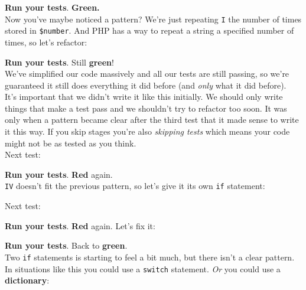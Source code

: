 \textbf{Run your tests}. \textbf{Green.}
\\

Now you've maybe noticed a pattern? We're just repeating \texttt{I} the number of times stored in \texttt{\$number}. And PHP has a way to repeat a string a specified number of times, so let's refactor:


\textbf{Run your tests}. Still \textbf{green}!
\\

We've simplified our code massively and all our tests are still passing, so we're guaranteed it still does everything it did before (and \textit{only} what it did before).
\\

It's important that we didn't write it like this initially. We should only write things that make a test pass and we shouldn't try to refactor too soon. It was only when a pattern became clear after the third test that it made sense to write it this way. If you skip stages you're also \textit{skipping tests} which means your code might not be as tested as you think.
\\


Next test:



\textbf{Run your tests}. \textbf{Red} again.
\\

\texttt{IV} doesn't fit the previous pattern, so let's give it its own \texttt{if} statement:




Next test:


\textbf{Run your tests}. \textbf{Red} again. Let's fix it:




\textbf{Run your tests}. Back to \textbf{green}.
\\

Two \texttt{if} statements is starting to feel a bit much, but there isn't a clear pattern. In situations like this you could use a \texttt{switch} statement. \textit{Or} you could use a \textbf{dictionary}:


